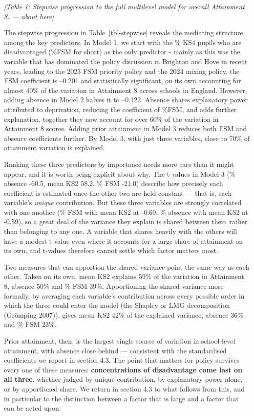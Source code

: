 \documentclass[
  12pt,
  titlepage]{article}
\begin{document}
\emph{{[}Table 1: Stepwise progression to the full multilevel model for
overall Attainment 8. --- about here{]}}

The stepwise progression in Table~\ref{tbl-stepwise} reveals the
mediating structure among the key predictors. In Model 1, we start with
the \% KS4 pupils who are disadvantaged (\%FSM for short) as the only
predictor - mainly as this was the variable that has dominated the
policy discussion in Brighton and Hove in recent years, leading to the
2023 FSM priority policy and the 2024 mixing policy. the FSM coefficient
is --0.201 and statistically significant, on its own accounting for
almost 40\% of the variation in Attainment 8 across schools in England.
However, adding absence in Model 2 halves it to --0.122. Absence shares
explanatory power attributed to deprivation, reducing the coefficient of
\%FSM, and adds further explanation, together they now account for over
60\% of the variation in Attainment 8 scores. Adding prior attainment in
Model 3 reduces both FSM and absence coefficients further. By Model 3,
with just three variables, close to 70\% of attainment variation is
explained.

Ranking these three predictors by importance needs more care than it
might appear, and it is worth being explicit about why. The t-values in
Model 3 (\% absence -60.5, mean KS2 58.2, \% FSM -21.0) describe how
precisely each coefficient is estimated once the other two are held
constant --- that is, each variable's \emph{unique} contribution. But
these three variables are strongly correlated with one another (\% FSM
with mean KS2 at -0.69, \% absence with mean KS2 at -0.59), so a great
deal of the variance they explain is shared between them rather than
belonging to any one. A variable that shares heavily with the others
will have a modest t-value even where it accounts for a large share of
attainment on its own, and t-values therefore cannot settle which factor
matters most.

Two measures that can apportion the shared variance point the same way
as each other. Taken on its own, mean KS2 explains 59\% of the variation
in Attainment 8, absence 50\% and \% FSM 39\%. Apportioning the shared
variance more formally, by averaging each variable's contribution across
every possible order in which the three could enter the model (the
Shapley or LMG decomposition (Grömping 2007)), gives mean KS2 42\% of
the explained variance, absence 36\% and \% FSM 23\%.

Prior attainment, then, is the largest single source of variation in
school-level attainment, with absence close behind --- consistent with
the standardised coefficients we report in section 4.3. The point that
matters for policy survives every one of these measures:
\textbf{concentrations of disadvantage come last on all three}, whether
judged by unique contribution, by explanatory power alone, or by
apportioned share. We return in section 4.3 to what follows from this,
and in particular to the distinction between a factor that is large and
a factor that can be acted upon.
\end{document}
